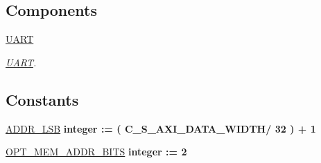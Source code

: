 \subsection*{Components}
 \begin{DoxyCompactItemize}
\item 
\hyperlink{classUART__v1__0__S00__AXI_1_1arch__imp_a6f88b8988ee3bab3eaaa301212c7f804}{U\+A\+RT}  {\bfseries }  
\begin{DoxyCompactList}\small\item\em \hyperlink{structUART}{U\+A\+RT}. \end{DoxyCompactList}\end{DoxyCompactItemize}
\subsection*{Constants}
 \begin{DoxyCompactItemize}
\item 
\mbox{\label{classUART__v1__0__S00__AXI_1_1arch__imp_a92f00d1b43f901f1bf5684d1e79aab84}} 
\hyperlink{classUART__v1__0__S00__AXI_1_1arch__imp_a92f00d1b43f901f1bf5684d1e79aab84}{A\+D\+D\+R\+\_\+\+L\+SB} {\bfseries \textcolor{vhdlchar}{integer}\textcolor{vhdlchar}{ }\textcolor{vhdlchar}{ }\textcolor{vhdlchar}{\+:}\textcolor{vhdlchar}{=}\textcolor{vhdlchar}{ }\textcolor{vhdlchar}{(}\textcolor{vhdlchar}{ }\textcolor{vhdlchar}{ }\textcolor{vhdlchar}{ }\textcolor{vhdlchar}{ }\textcolor{vhdlchar}{C\+\_\+\+S\+\_\+\+A\+X\+I\+\_\+\+D\+A\+T\+A\+\_\+\+W\+I\+D\+TH}\textcolor{vhdlchar}{/}\textcolor{vhdlchar}{ } \textcolor{vhdldigit}{32} \textcolor{vhdlchar}{ }\textcolor{vhdlchar}{)}\textcolor{vhdlchar}{ }\textcolor{vhdlchar}{+}\textcolor{vhdlchar}{ } \textcolor{vhdldigit}{1} \textcolor{vhdlchar}{ }} 
\item 
\mbox{\label{classUART__v1__0__S00__AXI_1_1arch__imp_a913a8d777fcc731ba920264a143ec91f}} 
\hyperlink{classUART__v1__0__S00__AXI_1_1arch__imp_a913a8d777fcc731ba920264a143ec91f}{O\+P\+T\+\_\+\+M\+E\+M\+\_\+\+A\+D\+D\+R\+\_\+\+B\+I\+TS} {\bfseries \textcolor{vhdlchar}{integer}\textcolor{vhdlchar}{ }\textcolor{vhdlchar}{ }\textcolor{vhdlchar}{\+:}\textcolor{vhdlchar}{=}\textcolor{vhdlchar}{ }\textcolor{vhdlchar}{ } \textcolor{vhdldigit}{2} \textcolor{vhdlchar}{ }} 
\end{DoxyCompactItemize}

